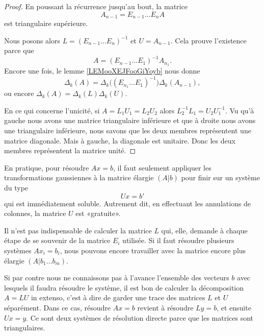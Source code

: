 \begin{proof}
    En poussant la récurrence jusqu'au bout, la matrice
    \begin{equation}
        A_{n-1}=E_{n-1}\ldots E_nA
    \end{equation}
    est triangulaire supérieure. 

    Nous posons alors \(   L=(E_{n-1}\ldots E_n)^{-1}  \) et \( U=A_{n-1}\). Cela prouve l'existence parce que
    \begin{equation}
        A=(E_{n-1}\ldots E_1)^{-1}A_{n_1}.
    \end{equation}
    Encore une fois, le lemme \ref{LEMooXEJFooGiYoyb} nous donne
    \begin{equation}
        \Delta_k(A)=\Delta_k\Big( (E_{n_1}\ldots E_1)^{-1} \Big)\Delta_k(A_{n-1}),
    \end{equation}
    ou encore \( \Delta_k(A)=\Delta_k(L)\Delta_k(U)\).
    
    En ce qui concerne l'unicité, si \( A=L_1U_1=L_2U_2\) alors \( L_2^{-1}L_1=U_2U_1^{-1} \). Vu qu'à gauche nous avons une matrice triangulaire inférieure et que à droite nous avons une triangulaire inférieure, nous savons que les deux membres représentent une matrice diagonale. Mais à gauche, la diagonale est unitaire. Donc les deux membres représentent la matrice unité.
\end{proof}

\begin{normaltext}
    En pratique, pour résoudre \( Ax=b\), il faut seulement appliquer les transformations gaussiennes à la matrice élargie \( (A|b)\) pour finir sur un système du type
    \begin{equation}
        Ux=b'
    \end{equation}
    qui est immédiatement soluble. Autrement dit, en effectuant les annulations de colonnes, la matrice \( U\) est «gratuite».
    
    Il n'est pas indispensable de calculer la matrice \( L\) qui, elle, demande à chaque étape de se souvenir de la matrice \( E_i\) utilisée. Si il faut résoudre plusieurs systèmes \( Ax_i=b_i\), nous pouvons encore travailler avec la matrice encore plus élargie \( (A|b_1\ldots b_m)\).

    Si par contre nous ne connaissons pas à l'avance l'ensemble des vecteurs \( b\) avec lesquels il faudra résoudre le système, il est bon de calculer la décomposition \( A=LU \) in extenso, c'est à dire de garder une trace des matrices \( L\) et \( U\) séparément. Dans ce cas, résoudre \( Ax=b\) revient à résoudre \( Ly=b\), et ensuite \( Ux=y\). Ce sont deux systèmes de résolution directe parce que les matrices sont triangulaires.
\end{normaltext}

